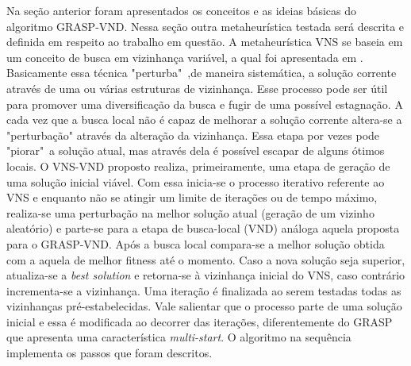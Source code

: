 \documentclass[12pt]{article}
\begin{document}
Na seção anterior foram apresentados os conceitos e as ideias básicas do algoritmo GRASP-VND. Nessa seção outra metaheurística testada será descrita e definida em respeito ao trabalho em questão. A metaheurística VNS se baseia em um conceito de busca em vizinhança variável, a qual foi apresentada em \cite{VND97}. Basicamente essa técnica "perturba"~,de maneira sistemática, a solução corrente através de uma ou várias estruturas de vizinhança. Esse processo pode ser útil para promover uma diversificação da busca e fugir de uma possível estagnação. A cada vez que a busca local não é capaz de melhorar a solução corrente altera-se a "perturbação" através da alteração da vizinhança. Essa etapa por vezes pode "piorar"~a solução atual, mas através dela é possível escapar de alguns ótimos locais. O VNS-VND proposto realiza, primeiramente, uma etapa de geração de uma solução inicial viável. Com essa inicia-se o processo iterativo referente ao VNS e enquanto não se atingir um limite de iterações ou de tempo máximo, realiza-se uma perturbação na melhor solução atual (geração de um vizinho aleatório) e parte-se para a etapa de busca-local (VND) análoga aquela proposta para o GRASP-VND. Após a busca local compara-se a melhor solução obtida com a aquela de melhor fitness até o momento. Caso a nova solução seja superior, atualiza-se a \textit{best solution} e retorna-se à vizinhança inicial do VNS, caso contrário incrementa-se a vizinhança. Uma iteração é finalizada ao serem testadas todas as vizinhanças pré-estabelecidas. Vale salientar que o processo parte de uma solução inicial e essa é modificada ao decorrer das iterações, diferentemente do GRASP que apresenta uma característica \textit{multi-start}. O algoritmo na sequência implementa os passos que foram descritos.
\end{document}
